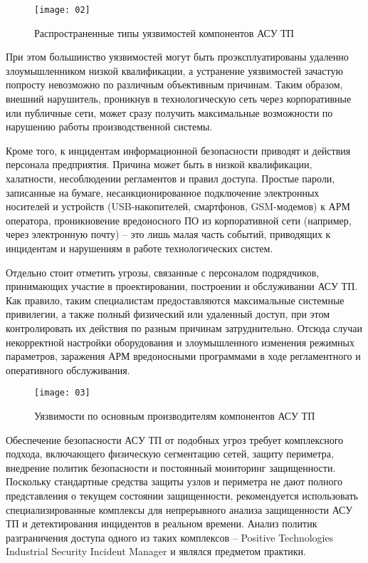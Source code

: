 \begin{figure}[h!]
    \centering
    \texttt{[image: 02]}
    \caption{Распространенные типы уязвимостей компонентов АСУ ТП}
    \label{img:02}
\end{figure}

При этом большинство уязвимостей могут быть проэксплуатированы удаленно злоумышленником низкой квалификации, а устранение уязвимостей зачастую попросту невозможно по различным объективным причинам. Таким образом, внешний нарушитель, проникнув в технологическую сеть через корпоративные или публичные сети, может сразу получить максимальные возможности по нарушению работы производственной системы.\par

Кроме того, к инцидентам информационной безопасности приводят и действия персонала предприятия. Причина может быть в низкой квалификации, халатности, несоблюдении регламентов и правил доступа. Простые пароли, записанные на бумаге, несанкционированное подключение электронных носителей и устройств (USB-накопителей, смартфонов, GSM-модемов) к АРМ оператора, проникновение вредоносного ПО из корпоративной сети (например, через электронную почту) -- это лишь малая часть событий, приводящих к инцидентам и нарушениям в работе технологических систем.\par

Отдельно стоит отметить угрозы, связанные с персоналом подрядчиков, принимающих участие в проектировании, построении и обслуживании АСУ ТП. Как правило, таким специалистам предоставляются максимальные системные привилегии, а также полный физический или удаленный доступ, при этом контролировать их действия по разным причинам затруднительно. Отсюда случаи некорректной настройки оборудования и злоумышленного изменения режимных параметров, заражения АРМ вредоносными программами в ходе регламентного и оперативного обслуживания.\par

\begin{figure}[h!]
    \centering
    \texttt{[image: 03]}
    \caption{Уязвимости по основным производителям компонентов АСУ ТП}
    \label{img:03}
\end{figure}

Обеспечение безопасности АСУ ТП от подобных угроз требует комплексного подхода, включающего физическую сегментацию сетей, защиту периметра, внедрение политик безопасности и постоянный мониторинг защищенности. Поскольку стандартные средства защиты узлов и периметра не дают полного представления о текущем состоянии защищенности, рекомендуется использовать специализированные комплексы для непрерывного анализа защищенности АСУ ТП и детектирования инцидентов в реальном времени. Анализ политик разграничения доступа одного из таких комплексов -- Positive Technologies Industrial Security Incident Manager и являлся предметом практики.\\
